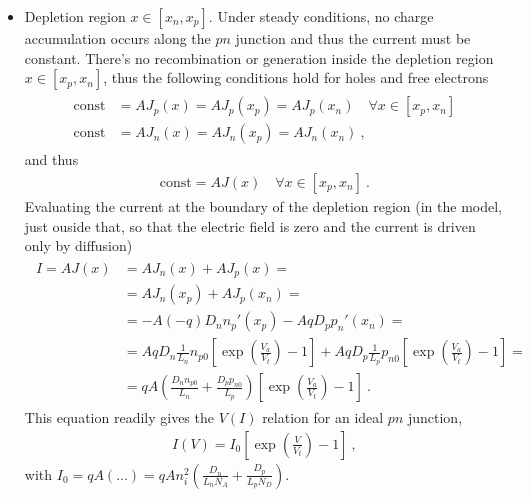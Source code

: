 \documentclass[letterpaper,10pt,english]{jupyterBook}
\begin{document}
\sphinxAtStartPar
{}
\begin{itemize}
\item {} 
\sphinxAtStartPar
Depletion region \(x \in [x_n, x_p]\). Under steady conditions, no charge accumulation occurs along the \(p\)\sphinxhyphen{}\(n\) junction and thus the current must be constant. There’s no recombination or generation inside the depletion region \(x \in [x_p, x_n]\), thus the following conditions hold for holes and free electrons
\begin{equation*}
\begin{split}\begin{aligned}
     \text{const} & = A J_p(x) = A J_p(x_p) = A J_p(x_n)  \quad \forall x \in [x_p, x_n] \\
     \text{const} & = A J_n(x) = A J_n(x_p) = A J_n(x_n) \ ,
   \end{aligned}\end{split}
\end{equation*}
\sphinxAtStartPar
and thus
\begin{equation*}
\begin{split}\text{const} = A J(x) \quad \forall x \in [x_p, x_n] \ .\end{split}
\end{equation*}
\sphinxAtStartPar
Evaluating the current at the boundary of the depletion region (in the model, just ouside that, so that the electric field is zero and the current is driven only by diffusion)
\begin{equation*}
\begin{split}\begin{aligned}
     I = A J(x)
     & = A J_n(x) + A J_p(x) = \\
     & = A J_n(x_p) + A J_p(x_n) = \\
     & = - A (-q) D_n n_p'(x_p) - A q D_p p_n'(x_n) = \\
     & = A q D_n \frac{1}{L_n} n_{p0} \left[ \exp \left( \frac{V_a}{V_t} \right) - 1 \right] + A q D_p \frac{1}{L_p} p_{n0} \left[ \exp \left( \frac{V_a}{V_t} \right) - 1 \right] = \\
     & = q A \left( \frac{D_n n_{p0}}{L_n} + \frac{D_p p_{n0}}{L_p} \right) \left[ \exp \left( \frac{V_a}{V_t} \right) - 1 \right] \ .
   \end{aligned}\end{split}
\end{equation*}
\sphinxAtStartPar
This equation readily gives the \(V(I)\) relation for an ideal \(p\)\sphinxhyphen{}\(n\) junction,
\begin{equation}\label{equation:ch/solid-state/semiconductors-pn-junctions:eq:semiconductors:pn-junction:iv}
\begin{split} I(V) = I_0 \left[ \exp \left( \frac{V}{V_t} \right) - 1  \right] \ , \end{split}
\end{equation}
\sphinxAtStartPar
with \(I_0 = q A \left( \dots \right) = q A n_i^2 \left( \frac{D_n}{L_n N_A} + \frac{D_p}{L_p N_D} \right)\).


\end{itemize}
\end{document}
